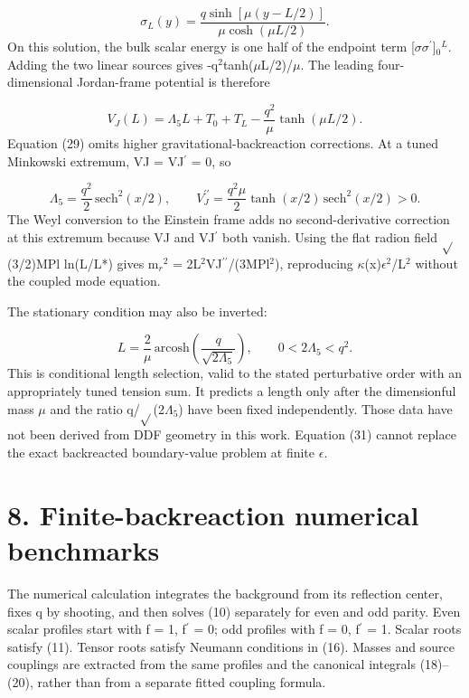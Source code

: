 \documentclass[11pt]{article}
\begin{document}
\begin{equation}
\sigma_L(y)=\frac{q\sinh[\mu(y-L/2)]}{\mu\cosh(\mu L/2)}.\tag{28}
\end{equation}
On this solution, the bulk scalar energy is one half of the endpoint term [\(\sigma\)\(\sigma\)\({}^\prime\)]\({}_0\)\({}^L\). Adding the two linear sources gives -q\({}^2\)tanh(\(\mu\)L/2)/\(\mu\). The leading four-dimensional Jordan-frame potential is therefore

\begin{equation}
V_J(L)=\Lambda_5 L+T_0+T_L-\frac{q^2}{\mu}\tanh(\mu L/2).\tag{29}
\end{equation}
Equation (29) omits higher gravitational-backreaction corrections. At a tuned Minkowski extremum, VJ = VJ\({}^\prime\) = 0, so

\begin{equation}
\Lambda_5=\frac{q^2}{2}\,\mathrm{sech}^2(x/2),\qquad V_J^{\prime\prime}=\frac{q^2\mu}{2}\tanh(x/2)\,\mathrm{sech}^2(x/2)>0.\tag{30}
\end{equation}
The Weyl conversion to the Einstein frame adds no second-derivative correction at this extremum because VJ and VJ\({}^\prime\) both vanish. Using the flat radion field \(\sqrt{}\)(3/2)MPl ln(L/L*) gives m\({}_r\)\({}^2\) = 2L\({}^2\)VJ\({}^{\prime\prime}\)/(3MPl\({}^2\)), reproducing \(\kappa\)(x)\(\epsilon\)\({}^2\)/L\({}^2\) without the coupled mode equation.

The stationary condition may also be inverted:

\begin{equation}
L=\frac{2}{\mu}\,\mathrm{arcosh}\left(\frac{q}{\sqrt{2\Lambda_5}}\right),\qquad 0<2\Lambda_5<q^2.\tag{31}
\end{equation}
This is conditional length selection, valid to the stated perturbative order with an appropriately tuned tension sum. It predicts a length only after the dimensionful mass \(\mu\) and the ratio q/\(\sqrt{}\)(2\(\Lambda\)\({}_5\)) have been fixed independently. Those data have not been derived from DDF geometry in this work. Equation (31) cannot replace the exact backreacted boundary-value problem at finite \(\epsilon\).

\section*{8. Finite-backreaction numerical benchmarks}
The numerical calculation integrates the background from its reflection center, fixes q by shooting, and then solves (10) separately for even and odd parity. Even scalar profiles start with f = 1, f\({}^\prime\) = 0; odd profiles with f = 0, f\({}^\prime\) = 1. Scalar roots satisfy (11). Tensor roots satisfy Neumann conditions in (16). Masses and source couplings are extracted from the same profiles and the canonical integrals (18)--(20), rather than from a separate fitted coupling formula.
\end{document}
